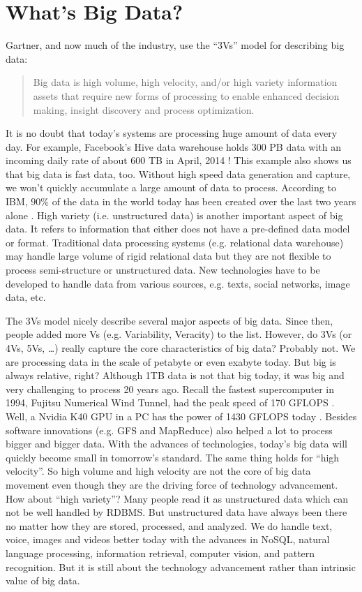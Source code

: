 \documentclass[11pt]{book}
\begin{document}
\section{What's Big Data?}
Gartner, and now much of the industry, use the ``3Vs'' model \cite{Laney2012} for describing big data:
\begin{quote}
Big data is high volume, high velocity, and/or high variety information assets that require new forms of processing to enable enhanced decision making, insight discovery and process optimization.
\end{quote}
It is no doubt that today's systems are processing huge amount of data every day. For example, Facebook's Hive data warehouse holds 300 PB data with an incoming daily rate of about 600 TB in April, 2014 \cite{VagateWilfong2014}! This example also shows us that big data is fast data, too. Without high speed data generation and capture, we won't quickly accumulate a large amount of data to process. According to IBM, $90\%$ of the data in the world today has been created over the last two years alone \cite{IBM2013}. High variety (i.e. unstructured data) is another important aspect of big data. It refers to information that either does not have a pre-defined data model or format. Traditional data processing systems (e.g. relational data warehouse) may handle large volume of rigid relational data but they are not flexible to process semi-structure or unstructured data. New technologies have to be developed to handle data from various sources, e.g. texts, social networks, image data, etc.

The 3Vs model nicely describe several major aspects of big data. Since then, people added more Vs (e.g. Variability, Veracity) to the list. However, do 3Vs (or 4Vs, 5Vs, \ldots) really capture the core characteristics of big data? Probably not. We are processing data in the scale of petabyte or even exabyte today. But big is always relative, right? Although 1TB data is not that big today, it was big and very challenging to process 20 years ago. Recall the fastest supercomputer in 1994, Fujitsu Numerical Wind Tunnel, had the peak speed of 170 GFLOPS \cite{Top500}. Well, a Nvidia K40 GPU in a PC has the power of 1430 GFLOPS today \cite{Nvidia2014}. Besides software innovations (e.g. GFS and MapReduce) also helped a lot to process bigger and bigger data. With the advances of technologies, today's big data will quickly become small in tomorrow's standard. The same thing holds for ``high velocity''. So high volume and high velocity are not the core of big data movement even though they are the driving force of technology advancement. How about ``high variety''? Many people read it as unstructured data which can not be well handled by RDBMS. But unstructured data have always been there no matter how they are stored, processed, and analyzed. We do handle text, voice, images and videos better today with the advances in NoSQL, natural language processing, information retrieval, computer vision, and pattern recognition. But it is still about the technology advancement rather than intrinsic value of big data.
\end{document}
